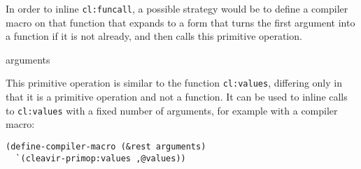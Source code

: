 In order to inline \texttt{cl:funcall}, a possible strategy would
be to define a compiler macro on that function that expands to a
form that turns the first argument into a function if it is not
already, and then calls this primitive operation.

 {\rest arguments}

This primitive operation is similar to the function \texttt{cl:values},
differing only in that it is a primitive operation and not a function.
It can be used to inline calls to \texttt{cl:values} with a fixed
number of arguments, for example with a compiler macro:

\begin{verbatim}
(define-compiler-macro (&rest arguments)
  `(cleavir-primop:values ,@values))
\end{verbatim}

